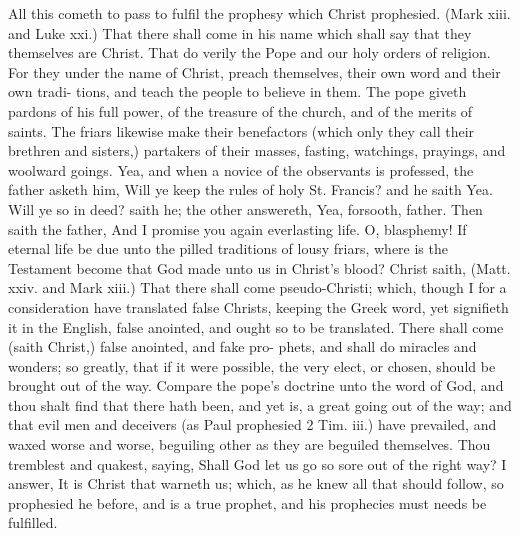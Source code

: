 \documentclass{custom}
\begin{document}
All this cometh to pass to fulfil the prophesy which 
Christ prophesied. (Mark xiii. and Luke xxi.) That 
there shall come in his name which shall say that they 
themselves are Christ. That do verily the Pope and our 
holy orders of religion. For they under the name of Christ, 
preach themselves, their own word and their own tradi- 
tions, and teach the people to believe in them. The pope 
giveth pardons of his full power, of the treasure of the 
church, and of the merits of saints. The friars likewise 
make their benefactors (which only they call their brethren 
and sisters,) partakers of their masses, fasting, watchings, 
prayings, and woolward goings. Yea, and when a novice 
of the observants is professed, the father asketh him, 
Will ye keep the rules of holy St. Francis? and he saith 
Yea. Will ye so in deed? saith he; the other answereth, 
Yea, forsooth, father. Then saith the father, And I 
promise you again everlasting life. O, blasphemy! If 
eternal life be due unto the pilled traditions of lousy friars, 
where is the Testament become that God made unto us 
in Christ's blood? Christ saith, (Matt. xxiv. and Mark 
xiii.) That there shall come pseudo-Christi; which, 
though I for a consideration have translated false Christs, 
keeping the Greek word, yet signifieth it in the English, 
false anointed, and ought so to be translated. There 
shall come (saith Christ,) false anointed, and fake pro- 
phets, and shall do miracles and wonders; so greatly, that 
if it were possible, the very elect, or chosen, should be 
brought out of the way. Compare the pope's doctrine 
unto the word of God, and thou shalt find that there hath 
been, and yet is, a great going out of the way; and that 
evil men and deceivers (as Paul prophesied 2 Tim. iii.) 
have prevailed, and waxed worse and worse, beguiling 
other as they are beguiled themselves. Thou tremblest 
and quakest, saying, Shall God let us go so sore out of 
the right way? I answer, It is Christ that warneth us; 
which, as he knew all that should follow, so prophesied 
he before, and is a true prophet, and his prophecies must 
needs be fulfilled. 
\end{document}
